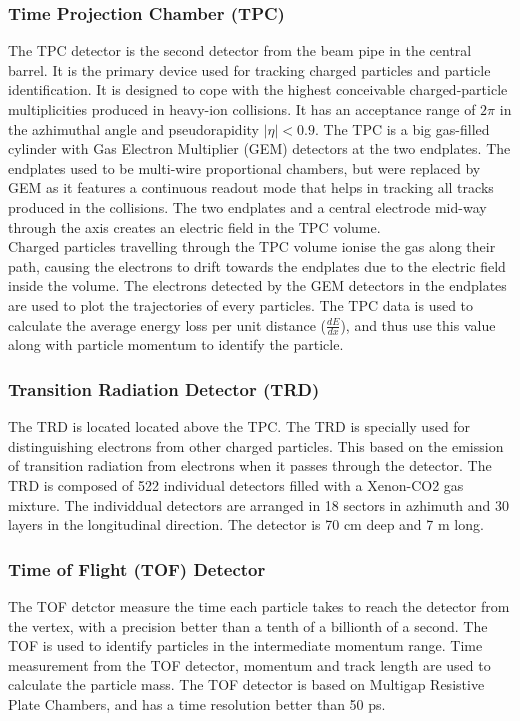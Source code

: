 \documentclass[12pt,a4paper,twoside]{report}
\begin{document}
\subsubsection{Time Projection Chamber (TPC)}
The TPC detector is the second detector from the beam pipe in the central barrel. It is the primary device used for tracking charged particles and particle identification. It is designed to cope with the highest conceivable charged-particle multiplicities produced in heavy-ion collisions. It has an acceptance range of $2\pi$ in the azhimuthal angle and pseudorapidity $|\eta|<0.9$. The TPC is a big gas-filled cylinder with Gas Electron Multiplier (GEM) detectors at the two endplates. The endplates used to be multi-wire proportional chambers, but were replaced by GEM as it features a continuous readout mode that helps in tracking all tracks produced in the collisions. The two endplates and a central electrode mid-way through the axis creates an electric field in the TPC volume.\\
Charged particles travelling through the TPC volume ionise the gas along their path, causing the electrons to drift towards the endplates due to the electric field inside the volume. The electrons detected by the GEM detectors in the endplates are used to plot the trajectories of every particles. The TPC data is used to calculate the average energy loss per unit distance ($\frac{dE}{dx}$), and thus use this value along with particle momentum to identify the particle. 
\subsubsection{Transition Radiation Detector (TRD)}
The TRD is located located above the TPC. The TRD is specially used for distinguishing electrons from other charged particles. This based on the emission of transition radiation from electrons when it passes through the detector. The TRD is composed of 522 individual detectors filled with a Xenon-CO2 gas mixture. The individdual detectors are arranged in 18 sectors in azhimuth and 30 layers in the longitudinal direction. The detector is 70 cm deep and 7 m long.
\subsubsection{Time of Flight (TOF) Detector}
The TOF detctor measure the time each particle takes to reach the detector from the vertex, with a precision better than a tenth of a billionth of a second. The TOF is used to identify particles in the intermediate momentum range. Time measurement from the TOF detector, momentum and track length are used to calculate the particle mass. The TOF detector is based on Multigap Resistive Plate Chambers, and has a time resolution better than 50 ps.
\end{document}
